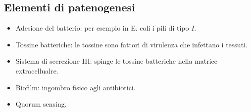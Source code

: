 		\subsection{Elementi di patenogenesi}
		\begin{multicols}{2}
			\begin{itemize}
				\item Adesione del batterio: per esempio in E. coli i pili di tipo $I$.
				\item Tossine batteriche: le tossine sono fattori di virulenza che infettano i tessuti.
				\item Sistema di secrezione III: spinge le tossine batteriche nella matrice extracellualre.
				\item Biofilm: ingombro fisico agli antibiotici.
				\item Quorum sensing.
			\end{itemize}
		\end{multicols}
